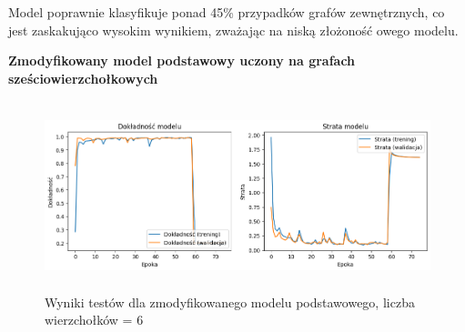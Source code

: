 Model poprawnie klasyfikuje ponad 45\% przypadków grafów zewnętrznych, co jest zaskakująco wysokim wynikiem,
zważając na niską złożoność owego modelu.




\textbf{Zmodyfikowany model podstawowy uczony na grafach sześciowierzchołkowych}




\begin{figure}[ht]
	\centering
	\includegraphics[height=5.5cm]{resources/tests/images/v4/base6_1_img.png}
	\caption{Wyniki testów dla zmodyfikowanego modelu podstawowego, liczba wierzchołków = 6}
	\label{Fig:tests-base-5a}
\end{figure}
\FloatBarrier


